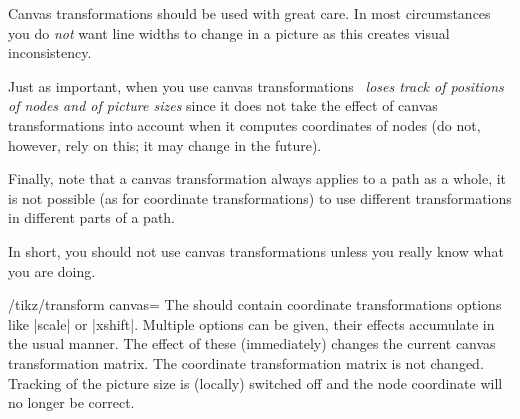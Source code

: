 Canvas transformations should be used with great care. In most circumstances
you do \emph{not} want line widths to change in a picture as this creates
visual inconsistency.

Just as important, when you use canvas transformations \emph{\pgfname\ loses
track of positions of nodes and of picture sizes} since it does not take the
effect of canvas transformations into account when it computes coordinates of
nodes (do not, however, rely on this; it may change in the future).

Finally, note that a canvas transformation always applies to a path as a whole,
it is not possible (as for coordinate transformations) to use different
transformations in different parts of a path.

In short, you should not use canvas transformations unless you really know what
you are doing.

\begin{key}{/tikz/transform canvas=}
    The  should contain coordinate transformations options like
    |scale| or |xshift|. Multiple options can be given, their effects
    accumulate in the usual manner. The effect of these 
    (immediately) changes the current canvas transformation matrix. The
    coordinate transformation matrix is not changed. Tracking of the picture
    size is (locally) switched off and the node coordinate will no longer be
    correct.
\begin{codeexample}[]
\end{codeexample}
\end{key}
